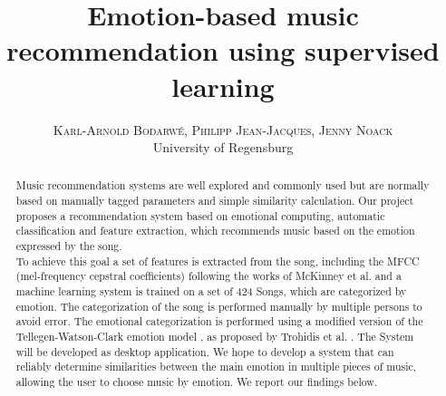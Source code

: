 

\title{\vspace{-15mm}\fontsize{24pt}{10pt}\selectfont\textbf{Emotion-based music recommendation using supervised learning}}

\author{
	\large
	\textsc{Karl-Arnold Bodarwé, Philipp Jean-Jacques, Jenny Noack}\\
	\normalsize University of Regensburg \\ %
	\vspace{-5mm}
}
\date{}



\maketitle
\thispagestyle{fancy}

\begin{abstract}
Music recommendation systems are well explored and commonly used but are normally based on
manually tagged parameters and simple similarity calculation. Our project proposes a recommendation system based on emotional computing, automatic classification and feature extraction, which recommends music based on the emotion expressed by the song.\\
To achieve this goal a set of features is extracted from the song, including the MFCC (mel-frequency cepstral coefficients) following the works of McKinney et al. \citep{Mckinney2003} and a machine learning system is trained on a set of 424 Songs, which are categorized by emotion. The categorization of the song is performed manually by multiple persons to avoid error. The emotional categorization is performed using a modified version of the Tellegen-Watson-Clark emotion model \citep{Tellegen1999}, as proposed by Trohidis et al. \citep{Trohidis2008}.
The System will be developed as desktop application. We hope to develop a system that can reliably determine similarities between the main emotion in multiple pieces of music, allowing the user to choose music by emotion. We report our findings below.
\end{abstract}

